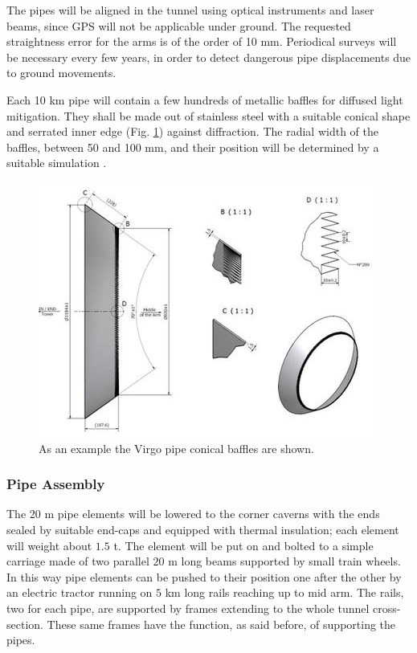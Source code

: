 The pipes will be aligned in the tunnel using optical instruments and laser beams, since GPS will not be applicable under ground. The requested straightness error for the arms is of the order of 10 mm. Periodical surveys will be necessary every few years, in order to detect dangerous pipe displacements due to ground movements.

Each 10 km pipe will contain a few hundreds of metallic baffles for diffused light mitigation. They shall be made out of stainless steel with a suitable conical shape and serrated inner edge (Fig. \ref{fig:vac5}) against diffraction. The radial width of the baffles, between 50 and 100 mm, and their position will be determined by a suitable simulation \cite{vinet97} \cite{vinet96}.

\begin{figure}
\begin{center}
\includegraphics{Sec_SiteInfra/Figures/VAC5.jpg}
\caption{As an example the Virgo pipe conical baffles are shown.}
\label{fig:vac5}
\end{center}
\end{figure}


\subsubsection{Pipe Assembly}

The $20$ m pipe elements will be lowered to the corner caverns with the ends sealed by suitable end-caps and equipped with thermal insulation; each element will weight about $1.5$ t. The element will be put on and bolted to a simple carriage made of two parallel $20$ m long beams supported by small train wheels. In this way pipe elements can be pushed to their position one after the other by an electric tractor running on $5$ km long rails reaching up to mid arm. The rails, two for each pipe, are supported by frames extending to the whole tunnel cross-section. These same frames have the function, as said before, of supporting the pipes.

